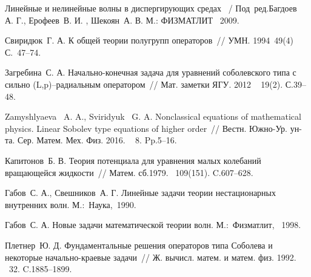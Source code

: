 \begin{thebibliography}{9} %







 Линейные и нелинейные волны в диспергирующих средах ~/ Под~ред.Багдоев~ А. Г., Ерофеев~В. И. ,  Шекоян~А. В. М.: ФИЗМАТЛИТ  ~2009.

  Свиридюк~Г. А. К общей теории полугрупп операторов~// УМН. 1994\textnumero~49(4) С.~47--74.

  Загребина~С. А. Начально-конечная задача для уравнений соболевского типа с сильно (L,p)--радиальным оператором~// Мат. заметки ЯГУ. 2012 \textnumero~ 19(2). С.39--48.


  Zamyshlyaeva ~A. A., Sviridyuk ~G. A.  Nonclassical equations of mathematical physics. Linear Sobolev type equations of higher order~// Вестн. Южно-Ур. ун-та. Сер. Матем. Мех. Физ. 2016. \textnumero~ 8. Pp.5--16.

   Капитонов~Б. В. Теория потенциала для уравнения малых колебаний вращающейся жидкости~// Матем. сб.1979. \textnumero~109(151). C.607--628.

   Габов~С. А.,  Свешников~А. Г.  Линейные задачи теории нестационарных внутренних волн. М.:~Наука,~1990.

 Габов~С. А.   Новые задачи математической теории волн. М.:~Физматлит, ~1998.

   Плетнер~Ю. Д. Фундаментальные решения операторов типа Соболева и некоторые начально-краевые задачи~// Ж. вычисл. матем. и матем. физ. 1992. \textnumero~32. C.1885--1899.



\end{thebibliography}
